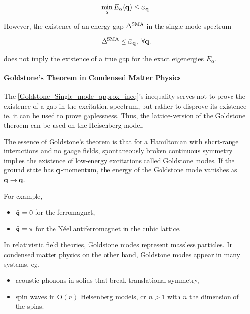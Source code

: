 \documentclass{homework}
\begin{document}
\begin{equation}
    \min_{\alpha} E_{\alpha}({\bf q}) \leq \bar{\omega}_{{\bf q}}.
    \label{Goldstone_Single_mode_approx_ineq}
\end{equation}

However, the existence of an energy gap $\Delta^{\textnormal{SMA}}$ in the single-mode spectrum,

\begin{equation}
    \Delta^{\textnormal{SMA}} \leq  \bar{\omega}_{{\bf q}}, \textnormal{ } \forall {\bf q}.
\end{equation}

does not imply the existence of a true gap for the exact eigenergies $E_{\alpha}$. \\

\paragraph{\textbf{Goldstone's Theorem in Condensed Matter Physics}}

The \cref{Goldstone_Single_mode_approx_ineq}'s inequality serves not to prove the existence of a gap in the excitation spectrum, but rather to disprove its existence ie. it can be used to prove gaplessness. Thus, the lattice-version of the Goldstone theroem can be used on the Heisenberg model. \\

\begin{tcolorbox}[colback = yellow, title = Physical Context]

The essence of Goldstone's theorem is that for a Hamiltonian with short-range interactions and no gauge fields, spontaneously broken continuous symmetry implies the existence of low-energy excitations called \underline{Goldstone modes}. If the ground state has $\bar{\bf q}$-momentum, the energy of the Goldstone mode vanishes as ${\bf q} \rightarrow \bar{\bf q}.$

\begin{tcolorbox}[colback = Bittersweet, title = Example]

For example, 

\begin{itemize}
    \item $\bar{ \bf q} = 0$ for the ferromagnet, 
    \item $\bar{ \bf q} = \pi$ for the Néel antiferromagnet in the cubic lattice.
\end{itemize}

\end{tcolorbox}

In relativistic field theories, Goldstone modes represent massless particles. In condensed matter physics on the other hand, Goldstone modes appear in many systems, eg.

\begin{itemize}
    \item acoustic phonons in solids that break translational symmetry, 
    \item spin waves in O$(n)$ Heisenberg models, or $n > 1$ with $n$ the dimension of the spins. 
\end{itemize}

\end{tcolorbox}
\end{document}
